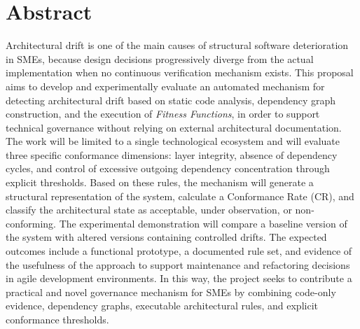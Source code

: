 
\section*{Abstract}

Architectural drift is one of the main causes of structural software deterioration in SMEs, because design decisions progressively diverge from the actual implementation when no continuous verification mechanism exists. This proposal aims to develop and experimentally evaluate an automated mechanism for detecting architectural drift based on static code analysis, dependency graph construction, and the execution of \textit{Fitness Functions}, in order to support technical governance without relying on external architectural documentation. The work will be limited to a single technological ecosystem and will evaluate three specific conformance dimensions: layer integrity, absence of dependency cycles, and control of excessive outgoing dependency concentration through explicit thresholds. Based on these rules, the mechanism will generate a structural representation of the system, calculate a Conformance Rate (CR), and classify the architectural state as acceptable, under observation, or non-conforming. The experimental demonstration will compare a baseline version of the system with altered versions containing controlled drifts. The expected outcomes include a functional prototype, a documented rule set, and evidence of the usefulness of the approach to support maintenance and refactoring decisions in agile development environments. In this way, the project seeks to contribute a practical and novel governance mechanism for SMEs by combining code-only evidence, dependency graphs, executable architectural rules, and explicit conformance thresholds.


